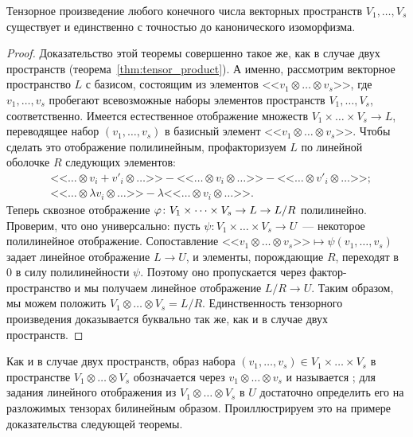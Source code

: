 \begin{theorem}
Тензорное произведение любого конечного числа векторных пространств
$V_1,\dots,V_s$ существует и единственно с точностью до канонического
изоморфизма.
\end{theorem}
\begin{proof}
Доказательство этой теоремы совершенно такое же, как в случае двух
пространств (теорема~\ref{thm:tensor_product}).
А именно, рассмотрим векторное пространство $L$ с
базисом, состоящим из элементов
$\mbox{<<}v_1\otimes\dots\otimes v_s\mbox{>>}$, где $v_1,\dots,v_s$
пробегают всевозможные наборы элементов пространств $V_1,\dots,V_s$,
соответственно. Имеется естественное отображение множеств
$V_1\times\dots\times V_s\to L$, переводящее набор
$(v_1,\dots,v_s)$ в базисный элемент
$\mbox{<<}v_1\otimes\dots\otimes v_s\mbox{>>}$. Чтобы сделать это
отображение полилинейным, профакторизуем $L$ по линейной оболочке $R$
следующих элементов:
\begin{align*}
&\mbox{<<}\dots\otimes v_i+v'_i\otimes\dots\mbox{>>} - 
\mbox{<<}\dots\otimes v_i\otimes\dots\mbox{>>} - 
\mbox{<<}\dots\otimes v'_i\otimes\dots\mbox{>>};\\
&\mbox{<<}\dots\otimes \lambda v_i\otimes\dots\mbox{>>} - 
\lambda\mbox{<<}\dots\otimes v_i\otimes\dots\mbox{>>}.
\end{align*}
Теперь сквозное отображение $\varphi\colon V_1\times\dots\times V_s\to
L\to L/R$ полилинейно. Проверим, что оно универсально:
пусть $\psi\colon V_1\times\dots\times V_s\to U$~--- некоторое
полилинейное отображение.
Сопоставление $\mbox{<<}v_1\otimes\dots\otimes v_s\mbox{>>} \mapsto
\psi(v_1,\dots,v_s)$ задает линейное отображение $L\to U$, и элементы,
порождающие $R$, переходят в $0$ в силу полилинейности $\psi$. Поэтому
оно пропускается через фактор-пространство и мы получаем линейное
отображение $L/R\to U$. Таким образом, мы можем положить
$V_1\otimes\dots\otimes V_s = L/R$. Единственность тензорного
произведения доказывается буквально так же, как и в случае двух
пространств.
\end{proof}

\begin{remark}
Как и в случае двух пространств, образ набора $(v_1,\dots,v_s)\in
V_1\times\dots\times V_s$ в пространстве $V_1\otimes\dots\otimes V_s$
обозначается через $v_1\otimes\dots\otimes v_s$ и называется
;
 для задания линейного отображения из
$V_1\otimes\dots\otimes V_s$ в $U$ достаточно определить его на
разложимых тензорах билинейным образом. Проиллюстрируем это на примере
доказательства следующей теоремы.
\end{remark}

